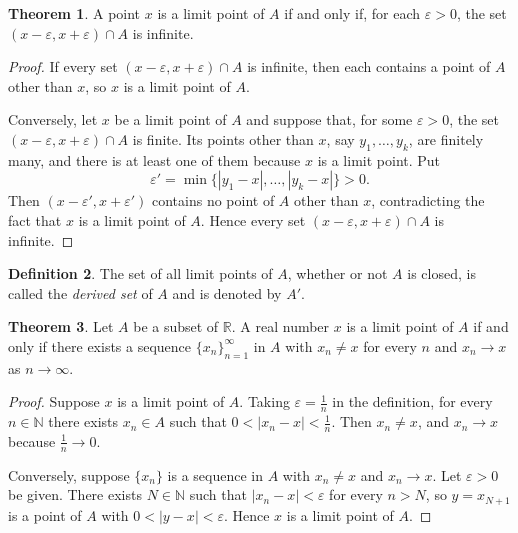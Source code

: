 \documentclass[11pt,a4paper]{article}
\numberwithin{equation}{section}
\theoremstyle{definition}
\newtheorem{thm}{Theorem}[subsection]
\newtheorem{defn}[thm]{Definition}
\begin{document}
\begin{thm}\label{thm:limptinfinite}
A point $x$ is a limit point of $A$ if and only if, for each $\varepsilon > 0$, the set $(x - \varepsilon, x + \varepsilon) \cap A$ is infinite.
\end{thm}

\begin{proof}
If every set $(x - \varepsilon, x + \varepsilon) \cap A$ is infinite, then each contains a point of $A$ other than $x$, so $x$ is a limit point of $A$.

Conversely, let $x$ be a limit point of $A$ and suppose that, for some $\varepsilon > 0$, the set $(x - \varepsilon, x + \varepsilon) \cap A$ is finite. Its points other than $x$, say $y_1, \dots, y_k$, are finitely many, and there is at least one of them because $x$ is a limit point. Put
$$\varepsilon' = \min\{|y_1 - x|, \dots, |y_k - x|\} > 0 .$$
Then $(x - \varepsilon', x + \varepsilon')$ contains no point of $A$ other than $x$, contradicting the fact that $x$ is a limit point of $A$. Hence every set $(x - \varepsilon, x + \varepsilon) \cap A$ is infinite.
\end{proof}


\begin{defn}
The set of all limit points of $A$, whether or not $A$ is closed, is called the \emph{derived set} of $A$ and is denoted by $A'$.
\end{defn}


\begin{thm}\label{thm:limptseq}
Let $A$ be a subset of $\mathbb{R}$. A real number $x$ is a limit point of $A$ if and only if there exists a sequence $\{x_n\}^{\infty}_{n = 1}$ in $A$ with $x_n\neq x$ for every $n$ and $x_n \longrightarrow x$ as $n \longrightarrow \infty$.
\end{thm}

\begin{proof}
Suppose $x$ is a limit point of $A$. Taking $\varepsilon = \frac{1}{n}$ in the definition, for every $n \in \mathbb{N}$ there exists $x_n \in A$ such that $0 < |x_n - x| < \frac{1}{n}$. Then $x_n\neq x$, and $x_n \longrightarrow x$ because $\frac{1}{n}\longrightarrow 0$.

Conversely, suppose $\{ x_n \}$ is a sequence in $A$ with $x_n\neq x$ and $x_n \longrightarrow x$. Let $\varepsilon > 0$ be given. There exists $N \in \mathbb{N}$ such that $| x_n - x| < \varepsilon$ for every $n > N$, so $y = x_{N+1}$ is a point of $A$ with $0<|y-x|<\varepsilon$. Hence $x$ is a limit point of $A$.
\end{proof}
\end{document}
